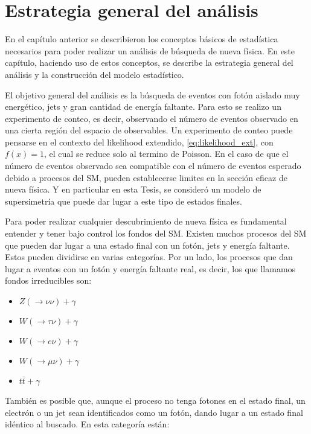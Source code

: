\chapter{Estrategia general del análisis}

En el capítulo anterior se describieron los conceptos básicos de estadística
necesarios para poder realizar un análisis de búsqueda de nueva física. En este
capítulo, haciendo uso de estos conceptos, se describe la estrategia general del
análisis y la construcción del modelo estadístico.

El objetivo general del análisis es la búsqueda de eventos con fotón aislado muy
energético, jets y gran cantidad de energía faltante. Para esto se realizo un
experimento de conteo, es decir, observando el número de eventos observado en
una cierta región del espacio de observables. Un experimento de conteo puede
pensarse en el contexto del likelihood extendido, \cref{eq:likelihood_ext}, con
$f(x) = 1$, el cual se reduce solo al termino de Poisson. En el caso de que el
número de eventos observado sea compatible con el número de eventos esperado
debido a procesos del SM, pueden establecerse limites en la sección eficaz
de nueva física. Y en particular en esta Tesis, se consideró un modelo
de supersimetría que puede dar lugar a este tipo de estados finales.%

Para poder realizar cualquier descubrimiento de nueva física es fundamental entender
y tener bajo control los fondos del SM.
Existen muchos procesos del SM que pueden dar lugar a una estado final con un fotón,
jets y energía faltante. Estos pueden dividirse en varias categorías. Por un lado, los
procesos que dan lugar a eventos con un fotón y energía faltante real, es decir, los
que llamamos fondos irreducibles son:

\begin{itemize}
\item $Z(\to\nu\nu)+\gamma$
\item $W(\to\tau\nu)+\gamma$ %
\item $W(\to e\nu)+\gamma$ %
\item $W(\to\mu\nu)+\gamma$ %
\item $t\bar{t}+\gamma$ %
\end{itemize}
%
También es posible que, aunque el proceso no tenga fotones en el estado final, un
electrón o un jet sean identificados como un fotón, dando lugar a un estado final
idéntico al buscado. En esta categoría están:

